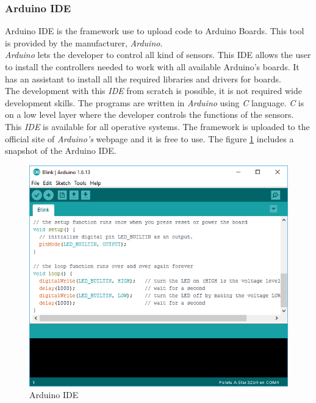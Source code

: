 \subsubsection{Arduino IDE}

Arduino IDE is the framework use to upload code to Arduino Boards. This tool is provided by the manufacturer, \textit{Arduino}.\\

\textit{Arduino} lets the developer to control all kind of sensors. This IDE allows the user to install the controllers needed to work with all available Arduino's boards. It has an assistant to install all the required libraries and drivers for boards.\\

The development with this \textit{IDE} from scratch is possible, it is not required wide development skills. The programs are written in \textit{Arduino} using \textit{C} language. \textit{C} is on a low level layer where the developer controls the functions of the sensors.\\

This \textit{IDE} is available for all operative systems. The framework is uploaded to the official site of  \textit{Arduino's} webpage and it is free to use. The figure \ref{ARDUINO_IDE} includes a snapshot of the Arduino IDE.\\

\begin{figure}[H]
\begin{centering}
\includegraphics[scale=0.7]{IMGS/ARDUINO_IDE.png}
\caption{Arduino IDE \label{ARDUINO_IDE}}
\end{centering}
\end{figure}

